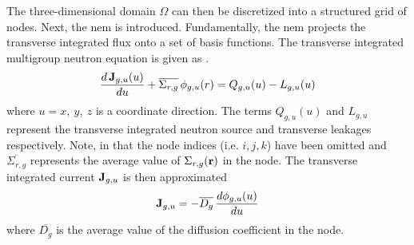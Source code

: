     The three-dimensional domain $\Omega$ can then be discretized into a
    structured grid of nodes. Next, the \gls{nem} is introduced. Fundamentally,
    the \gls{nem} projects the transverse integrated flux onto a set of basis
    functions. The transverse integrated multigroup neutron equation is given as
    \cite{qe2paper}.
    \begin{equation}
      \label{eq:transverse_multigroup_diffusion}
      \frac{d \, \mathbf{J}_{g,u} (u)}{d u} + \overline{\Sigma_{r,g}} \,
        \phi_{g,u}(r) = Q_{g,u}(u) - L_{g,u}(u)
    \end{equation}
    where $u = x,\ y,\ z$ is a coordinate direction. The terms $Q_{g,u}(u)$ and
    $L_{g,u}$ represent the transverse integrated neutron source and transverse
    leakages respectively. Note, in 
    that the node indices (i.e. $i,j,k$) have been omitted and
    $\overline{\Sigma_{r,g}}$ represents the average value of
    $\Sigma_{r,g}(\mathbf{r})$ in the node. The transverse integrated current
    $\mathbf{J}_{g,u}$ is then approximated
    \begin{equation}
      \label{eq:current_approximation}
      \mathbf{J}_{g,u} = - \overline{D_g} \, \frac{d \phi_{g,u}(u)}{du}
    \end{equation}
    where $\overline{D_g}$ is the average value of the diffusion coefficient in
    the node.

